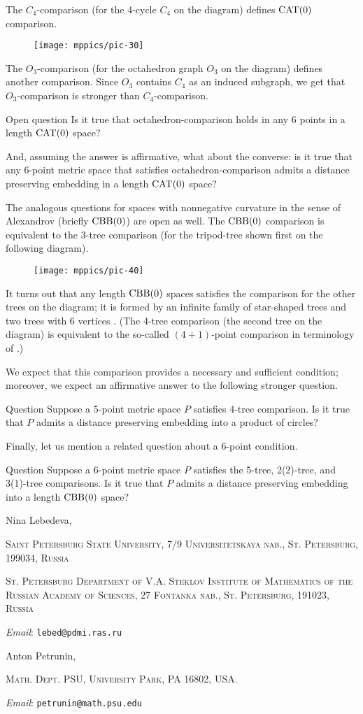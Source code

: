 \documentclass{article}
\makeatletter
\newcommand{\Addresses}{{\bigskip\footnotesize

\noindent Nina Lebedeva,
\par\nopagebreak
 \textsc{Saint Petersburg State University, 7/9 Universitetskaya nab., St. Petersburg, 199034, Russia}
\par
\nopagebreak
 \textsc{St. Petersburg Department of V.A. Steklov Institute of Mathematics of the Russian Academy of Sciences, 27 Fontanka nab., St. Petersburg, 191023, Russia}
  \par\nopagebreak
  \textit{Email}: \texttt{lebed@pdmi.ras.ru}

\medskip

\noindent   Anton Petrunin, 
\par\nopagebreak
 \textsc{Math. Dept. PSU, University Park, PA 16802, USA.}
  \par\nopagebreak
  \textit{Email}: \texttt{petrunin@math.psu.edu}
  
}}
\makeatother
\begin{document}
The $C_4$-comparison (for the 4-cycle $C_4$ on the diagram) defines $\mathrm{CAT}(0)$ comparison.
\begin{figure}[h!]
\vskip-0mm
\centering
\texttt{[image: mppics/pic-30]}
\end{figure}
The $O_3$-comparison (for the octahedron graph $O_3$ on the diagram) defines another comparison.
Since $O_3$ contains $C_4$ as an induced subgraph, we get that $O_3$-comparison is stronger than $C_4$-comparison.

\begin{thm}{Open question}
Is it true that octahedron-comparison holds in any 6 points in a length $\mathrm{CAT}(0)$ space?

And, assuming the answer is affirmative, what about the converse: is it true that any 6-point metric space that satisfies octahedron-comparison admits a distance preserving embedding in a length $\mathrm{CAT}(0)$ space?
\end{thm}


The analogous questions for  spaces with nonnegative curvature in the sense of Alexandrov (briefly $\mathrm{CBB}(0)$) are open as well.
The $\mathrm{CBB}(0)$ comparison is equivalent to the $3$-tree comparison (for the tripod-tree shown first on the following diagram).
\begin{figure}[h!]
\vskip-0mm
\centering
\texttt{[image: mppics/pic-40]}
\end{figure}
It turns out that any length $\mathrm{CBB}(0)$ spaces satisfies the comparison for the other trees on the diagram; it is formed by an infinite family of star-shaped trees and two trees with 6 vertices \cite{alexander-kapovitch-petrunin-2011,lebedeva-petrunin-zolotov}.
(The 4-tree comparison (the second tree on the diagram) is equivalent to the so-called $(4{+}1)$-point comparison in terminology of \cite{alexander-kapovitch-petrunin-2011}.)

We expect that this comparison provides a necessary and sufficient condition; moreover, we expect an affirmative answer to the following stronger question.


\begin{thm}{Question}
Suppose a 5-point metric space $P$ satisfies $4$-tree comparison.
Is it true that $P$ admits a distance preserving embedding into a product of circles?
\end{thm}

Finally, let us mention a related question about a 6-point condition. 

\begin{thm}{Question}
Suppose a 6-point metric space $P$ satisfies the 5-tree, 2(2)-tree, and 3(1)-tree comparisons.
Is it true that $P$ admits a distance preserving embedding into a length $\mathrm{CBB}(0)$ space?
\end{thm}

{\sloppy
\printbibliography[heading=bibintoc]
\fussy
}

\Addresses
\end{document}
